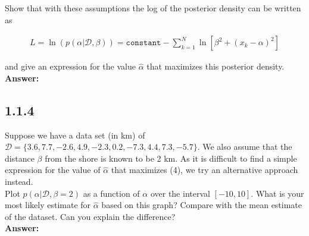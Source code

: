 \documentclass[a4paper]{article}
\begin{document}
Show that with these assumptions the log of the posterior density can be written as

\begin{eqnarray}
L = \ln (p(\alpha | \mathcal{D, \beta})) = \texttt{constant} - \sum_{k = 1}^N \ln [\beta^2 + (x_k - \alpha)^2] 
\end{eqnarray}

and give an expression for the value $\hat{\alpha}$ that maximizes this posterior density.\\

\textbf{Answer:}\\


\subsection*{1.1.4}

Suppose we have a data set (in km) of $\mathcal{D} = \{ 3.6, 7.7, -2.6, 4.9, -2.3, 0.2, -7.3, 4.4, 7.3, -5.7\}$. We also assume that the distance $\beta$ from the shore is known to be 2 km. As it is difficult to find a simple expression for the value of $\hat{\alpha}$ that maximizes (4), we try an alternative approach instead.\\

Plot $p(\alpha|\mathcal{D}, \beta = 2)$ as a function of $\alpha$ over the interval $[-10, 10]$. What is your most likely estimate for $\hat{\alpha}$ based on this graph? Compare with the mean estimate of the dataset. Can you explain the difference?\\


\textbf{Answer:}\\
\end{document}
